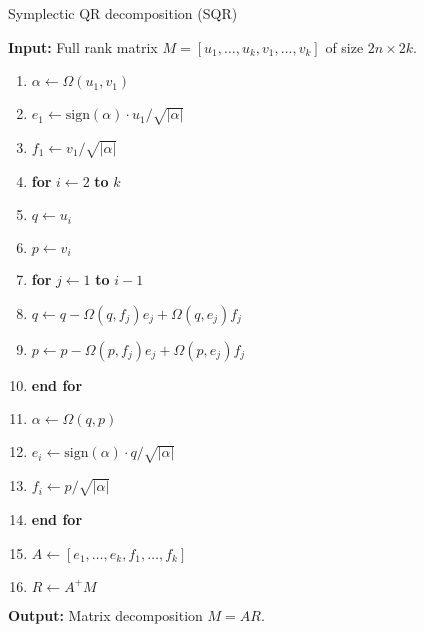 \begin{algorithm} 
\caption{Symplectic QR decomposition (SQR)} \label{alg:Append:1}
{\bf Input:} Full rank matrix $M = [u_1,\dots , u_k,v_1,\dots,v_k]$ of size $2n \times 2k$.
\begin{enumerate}
\item $\alpha \leftarrow \Omega(u_1,v_1)$
\item $e_1 \leftarrow \text{sign}(\alpha)\cdot u_1 / \sqrt{|\alpha|} $
\item $f_1 \leftarrow v_1 / \sqrt{|\alpha|}$
\item \textbf{for} $i\leftarrow 2$ \textbf{to} $k$
\item \hspace{0.5cm} $q \leftarrow u_i$
\item \hspace{0.5cm} $p \leftarrow v_i$
\item \hspace{0.5cm} \textbf{for} $j\leftarrow1$ \textbf{to} $i-1$
\item \hspace{0.5cm} \hspace{0.5cm} $q \leftarrow q - \Omega(q,f_j)e_j + \Omega(q,e_j)f_j$
\item \hspace{0.5cm} \hspace{0.5cm} $p \leftarrow p - \Omega(p,f_j)e_j + \Omega(p,e_j)f_j$
\item \hspace{0.5cm} \textbf{end for}
\item \hspace{0.5cm} $\alpha \leftarrow \Omega(q,p)$
\item \hspace{0.5cm} $e_i \leftarrow \text{sign}(\alpha) \cdot q / \sqrt{|\alpha|} $
\item \hspace{0.5cm} $f_i \leftarrow p / \sqrt{|\alpha|}$
\item \textbf{end for}
\item $A \leftarrow [e_1, \dots , e_k , f_1, \dots , f_k]$
\item $R \leftarrow A^+M$
\end{enumerate}

\vspace{0.5cm}
{\bf Output:} Matrix decomposition $M = AR$.
\end{algorithm}

